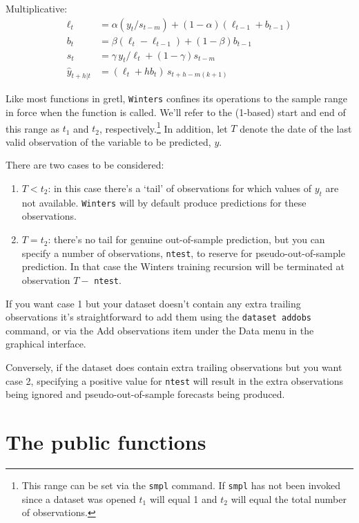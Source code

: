 \documentclass{article}
\begin{document}
Multiplicative:
\begin{align*}
  \ell_t &= \alpha (y_t / s_{t-m}) + (1-\alpha) (\ell_{t-1} + b_{t-1})\\
  b_t &= \beta (\ell_t - \ell_{t-1}) + (1-\beta) b_{t-1}\\
  s_t &= \gamma\, y_t / \ell_t + (1-\gamma) s_{t-m}\\
  \hat{y}_{t+h|t} &= (\ell_t + hb_t)\, s_{t+h-m(k+1)}
\end{align*}

Like most functions in gretl, \texttt{Winters} confines its operations
to the sample range in force when the function is called. We'll refer
to the (1-based) start and end of this range as $t_1$ and $t_2$,
respectively.\footnote{This range can be set via the \texttt{smpl}
  command. If \texttt{smpl} has not been invoked since a dataset was
  opened $t_1$ will equal 1 and $t_2$ will equal the total number of
  observations.}  In addition, let $T$ denote the date of the last
valid observation of the variable to be predicted, $y$.

There are two cases to be considered:
\begin{enumerate}
\item $T < t_2$: in this case there's a `tail' of observations for
  which values of $y_t$ are not available.  \texttt{Winters} will by
  default produce predictions for these observations.
\item $T = t_2$: there's no tail for genuine out-of-sample prediction,
  but you can specify a number of observations, \texttt{ntest}, to
  reserve for pseudo-out-of-sample prediction. In that case the
  Winters training recursion will be terminated at observation $T-$
  \texttt{ntest}.
\end{enumerate}

If you want case 1 but your dataset doesn't contain any extra trailing
observations it's straightforward to add them using the
\texttt{dataset addobs} command, or via the \textsf{Add observations}
item under the \textsf{Data} menu in the graphical interface.

Conversely, if the dataset does contain extra trailing observations
but you want case 2, specifying a positive value for \texttt{ntest}
will result in the extra observations being ignored and
pseudo-out-of-sample forecasts being produced.

\section{The public functions}
\end{document}
